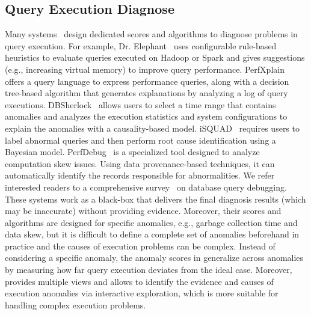 \subsection{Query Execution Diagnose}
Many systems~\cite{elephant, ma2020diagnosing, yoon2016dbsherlock, teoh2019perfdebug, liu2020fluxinfer, jeyakumar2019explainit, cloudera-manager} design dedicated scores and algorithms to diagnose problems in query execution. 
For example, Dr. Elephant~\cite{elephant} uses configurable rule-based heuristics to evaluate queries executed on Hadoop or Spark and gives suggestions (e.g., increasing virtual memory) to improve query performance. 
PerfXplain~\cite{khoussainova2012perfxplain} offers a query language to express performance queries, along with a decision tree-based algorithm that generates explanations by analyzing a log of query executions.
DBSherlock~\cite{yoon2016dbsherlock} allows users to select a time range that contains anomalies and analyzes the execution statistics and system configurations to explain the anomalies with a causality-based model.
iSQUAD~\cite{ma2020diagnosing} requires users to label abnormal queries and then perform root cause identification using a Bayesian model.
PerfDebug~\cite{teoh2019perfdebug} is a specialized tool designed to analyze computation skew issues. Using data provenance-based techniques, it can automatically identify the records responsible for abnormalities.
We refer interested readers to a comprehensive survey~\cite{gathani2020debugging} on database query debugging. 
These systems work as a black-box that delivers the final diagnosis results (which may be inaccurate) without providing evidence.
Moreover, their scores and algorithms are designed for specific anomalies, e.g., garbage collection time and data skew, but it is difficult to define a complete set of anomalies beforehand in practice and the causes of execution problems can be complex.
Instead of considering a specific anomaly, the anomaly scores in \qevis{} generalize across anomalies by measuring how far query execution deviates from the ideal case. Moreover, \qevis{} provides multiple views and allows to identify the evidence and causes of execution anomalies via interactive exploration, which is more suitable for handling complex execution problems.      

